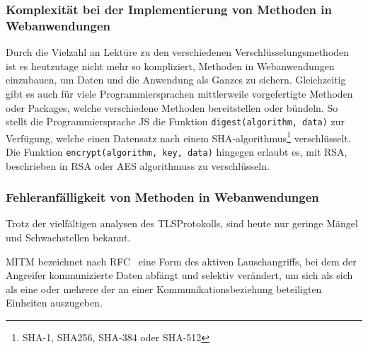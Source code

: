 \subsubsection[Komplexität bei der Implementierung von kryptografischen Methoden]{Komplexität bei der Implementierung von  Methoden in Webanwendungen}\label{subsubsec:komplexitaet_bei_der_implementierung_von_Kryptografischen_methoden_in_webanwendungen}
Durch die Vielzahl an Lektüre zu den verschiedenen Verschlüsselungsmethoden\autocites[\zb][]{davies2011implementing} ist es heutzutage nicht mehr so kompliziert,  Methoden in Webanwendungen einzubauen, um Daten und die Anwendung als Ganzes zu sichern.
Gleichzeitig gibt es auch für viele Programmiersprachen mittlerweile vorgefertigte Methoden oder Packages, welche verschiedene  Methoden bereitstellen oder bündeln.
So stellt die Programmiersprache \ac{JS} die Funktion \lstinline!digest(algorithm, data)! zur Verfügung, welche einen Datensatz nach einem \ac{SHA}-\gls{algorithmus}\footnote{\ac{SHA}-1, \gls{SHA256}, \ac{SHA}-384 oder \ac{SHA}-512} verschlüsselt.\autocite[\vglf][]{SubtleCr83:online}
Die Funktion \lstinline!encrypt(algorithm, key, data)! hingegen erlaubt es, mit RSA, beschrieben in \ac{RSA} oder \ac{AES} \glspl{algorithmus} zu verschlüsseln.

\subsubsection[Fehleranfälligkeit von kryptografischen Methoden in Webanwendungen]{Fehleranfälligkeit von  Methoden in Webanwendungen}\label{subsubsec:fehleranfaelligkeit_von_Kryptografischen_methoden_in_webanwendungen}
Trotz der vielfältigen analysen des \ac{TLS}\nonbreakdash Protokolls\autocites[Siehe \zb][]{krawczyk2013security, paulson1999inductive, dowling2015cryptographic, cremers2017comprehensive}, sind heute nur geringe Mängel und Schwachstellen bekannt.\autocite[\vglf][]{OPPLIGER20062238}

\begin{definition}
    \ac{MITM} bezeichnet nach \ac{RFC}\ \autocite[Übersetzt aus][]{rfc2828} eine Form des aktiven Lauschangriffs, bei dem der Angreifer kommunizierte Daten abfängt und selektiv verändert, um sich als sich als eine oder mehrere der an einer Kommunikationsbeziehung beteiligten Einheiten auszugeben.
\end{definition}

